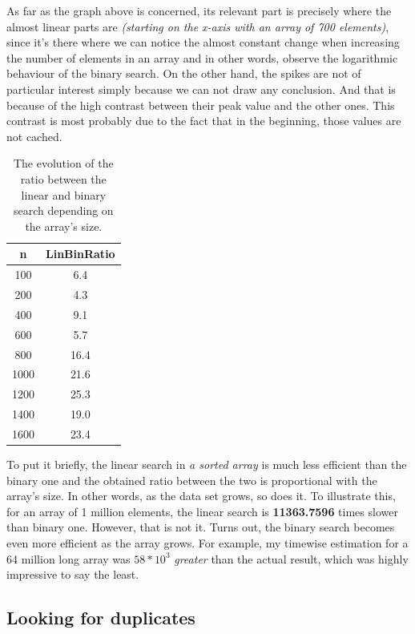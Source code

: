 \documentclass[a4paper,11pt]{article}
\begin{document}
As far as the graph above is concerned, its relevant part is precisely where the almost linear parts are \textit{(starting 
on the x-axis with an array of 
700 elements)}, since it's there where we can 
notice the almost constant change when increasing the 
number of elements in an array and in other words, observe the logarithmic behaviour of the binary search. \newline \newline
On the other hand, the spikes are not of particular interest simply because we can not draw any conclusion.
And that is because of the high contrast between their peak value and the other ones. This contrast is most probably due to the fact that 
in the beginning, those values are not cached.


\begin{table}[h!]
    \centering
    \begin{tabular}{||c c ||} 
    \hline\hline
    n & LinBinRatio \\ [0.5ex]
    \hline
    100 & 6.4\\
    200 & 4.3\\
    400 & 9.1\\
    600& 5.7\\
    800 & 16.4\\
    1000 & 21.6\\
    1200 & 25.3 \\
    1400 & 19.0 \\
    1600 & 23.4 \\ [1ex] 
    \hline
    \end{tabular}
    \caption{The evolution of the ratio between the linear and binary search depending on the array's size.} 
    \label{table:2}
\end{table}

To put it briefly, the linear search in \textit{a sorted array} is much less efficient than the binary one and the obtained ratio between 
the two is proportional with the array's 
size. In other words, as the data set grows, so does it. To illustrate this, for an array of 1 million elements,
the linear search is \textbf{11363.7596} times slower than binary one. However, that is not it.
Turns out, the binary search becomes even more efficient as the array grows. For example, my timewise estimation for a 64 million long
array was \textbf{$58*10^3$} \textit{greater} than the actual result, which was highly impressive to say the least. 

\subsection*{Looking for duplicates} 
\end{document}
